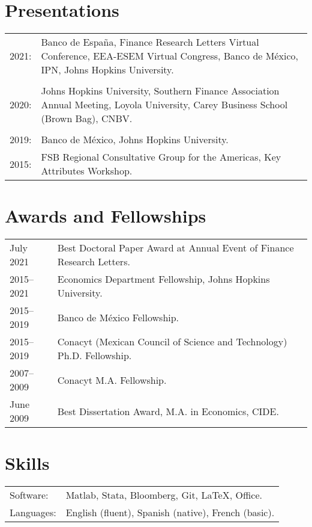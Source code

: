 \documentclass[12pt]{article}
\newcommand{\vsect}{\vspace{0.08cm}}
\begin{document}
	\section{Presentations} 
	\vsect
	\begin{tabular}[l]{ll}
		2021: & \multirow{1}{15cm}{Banco de España, Finance Research Letters Virtual Conference, EEA-ESEM Virtual Congress, Banco de México, IPN, Johns Hopkins University.} \\ & \\ %
		2020: & \multirow{1}{15cm}{Johns Hopkins University, Southern Finance Association Annual Meeting, Loyola University, Carey Business School (Brown Bag), CNBV.} \\ & \\
		2019: & Banco de México,  Johns Hopkins University. \\
		2015: & FSB Regional Consultative Group for the Americas, Key Attributes Workshop. \\ %
	\end{tabular}

	
	\section{Awards and Fellowships}
	\vsect
	\begin{tabular}[l]{ll}
		July 2021 & Best Doctoral Paper Award at Annual Event of Finance Research Letters. \\
		2015–2021 & Economics Department Fellowship, Johns Hopkins University. \\
		2015–2019 & Banco de México Fellowship. \\
		2015–2019 & Conacyt (Mexican Council of Science and Technology) Ph.D. Fellowship. \\
		2007–2009 & Conacyt M.A. Fellowship. \\
		June 2009 & Best Dissertation Award, M.A. in Economics, CIDE. \\
	\end{tabular}

	
	\section{Skills} 
	\vsect
	\begin{tabular}[l]{ll}
		Software: & Matlab, Stata, Bloomberg, Git, \LaTeX, Office. \\ %
		Languages: & English (fluent), Spanish (native), French (basic). \\
	\end{tabular}
	\medskip
	
\end{document}
